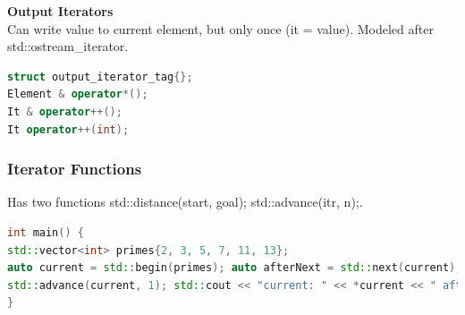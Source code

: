 \textbf{Output Iterators} \\
 Can write value to current element, but only once (\*it = value).  Modeled after std::ostream\_iterator. 

\begin{lstlisting}[language=C++]
struct output_iterator_tag{};
Element & operator*(); 
It & operator++(); 
It operator++(int);
\end{lstlisting}

\subsubsection{Iterator Functions}
Has two functions std::distance(start, goal); std::advance(itr, n);.

\begin{lstlisting}[language=C++]
int main() {
std::vector<int> primes{2, 3, 5, 7, 11, 13};
auto current = std::begin(primes); auto afterNext = std::next(current); std::cout << "current: " << *current << " afterNext: " << *afterNext << '\n';
std::advance(current, 1); std::cout << "current: " << *current << " afterNext: " << *afterNext << '\n';
}
\end{lstlisting}


\pagebreak
